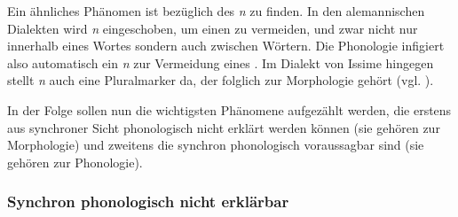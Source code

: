Ein ähnliches Phänomen ist bezüglich des \textit{n} zu finden. In den alemannischen Dialekten wird \textit{n} eingeschoben, um einen  zu vermeiden, und zwar nicht nur innerhalb eines Wortes sondern auch zwischen Wörtern. Die Phonologie infigiert also automatisch ein \textit{n} zur Vermeidung eines . Im Dialekt von Issime hingegen stellt \textit{n} auch eine Pluralmarker da, der folglich zur Morphologie gehört (vgl. ).

In der Folge sollen nun die wichtigsten Phänomene aufgezählt werden, die erstens aus synchroner Sicht phonologisch nicht erklärt werden können (sie gehören zur Morphologie) und zweitens die synchron phonologisch voraussagbar sind (sie gehören zur Phonologie).

\subsubsection{Synchron phonologisch nicht erklärbar}

